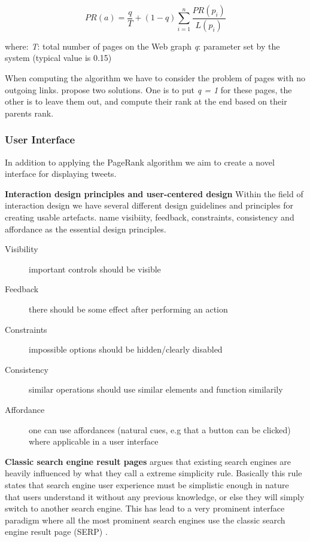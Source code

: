 \begin{displaymath}
PR(a) = \frac{q}{T} + (1 − q) \sum_{i=1}^{n} \frac{PR(p_i)}{L(p_i)}
\end{displaymath}

where:\newline
\emph{T}: total number of pages on the Web graph\newline
\emph{q}: parameter set by the system (typical value is 0.15)

When computing the algorithm we have to consider the problem of pages with no outgoing links. \citet{Baeza-Yates2011} propose two solutions. One is to put \emph{q = 1} for these pages, the other is to leave them out, and compute their rank at the end based on their parents rank. 


\subsubsection{User Interface}
In addition to applying the PageRank algorithm we aim to create a novel interface for displaying tweets.

{\bf Interaction design principles and user-centered design}\newline
Within the field of interaction design we have several different design guidelines and principles for creating usable artefacts. \citet{Sharp2007} name visibiity, feedback, constraints, consistency and affordance as the essential design principles.

\begin{description}
  \item[Visibility] important controls should be visible
  \item[Feedback] there should be some effect after performing an action
  \item[Constraints] impossible options should be hidden/clearly disabled
  \item[Consistency] similar operations should use similar elements and function similarily
  \item[Affordance] one can use affordances (natural cues, e.g that a button can be clicked) where applicable in a user interface
\end{description}

{\bf \noindent Classic search engine result pages}\newline
\citet[p.480]{Baeza-Yates2011} argues that existing search engines are heavily influenced by what they call a extreme simplicity rule. Basically this rule states that search engine user experience must be simplistic enough in nature that users understand it without any previous knowledge, or else they will simply switch to another search engine. This has lead to a very prominent interface paradigm where all the most prominent search engines use the classic search engine result page (SERP) \citep{Baeza-Yates2011}. 

